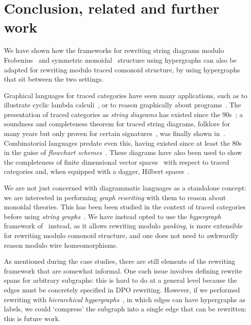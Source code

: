 \section{Conclusion, related and further work}

We have shown how the frameworks for rewriting string diagrams modulo
Frobenius~\cite{bonchi2022string} and symmetric
monoidal~\cite{bonchi2022stringa} structure using hypergraphs can also be
adapted for rewriting modulo traced comonoid structure, by using
hypergraphs that sit between the two settings.

Graphical languages for traced categories have seen many applications, such as
to illustrate cyclic lambda calculi~\cite{hasegawa1997recursion}, or to reason
graphically about programs~\cite{schweimeier1999categorical}.
The presentation of traced categories as \emph{string diagrams} has existed
since the 90s~\cite{joyal1991geometry,joyal1996traced}; a soundness and
completeness theorem for traced string diagrams, folklore for many years
but only proven for certain signatures~\cite{selinger2011survey}, was finally
shown in~\cite{kissinger2014abstract}.
Combinatorial languages predate even this, having existed since at least the 80s
in the guise of
\emph{flowchart schemes}~\cite{stefanescu1990feedback,cazanescu1990new,cazanescu1994feedback}.
These diagrams have also been used to show the completeness of finite dimensional
vector spaces~\cite{hasegawa2008finite} with respect to traced categories and,
when equipped with a dagger, Hilbert spaces~\cite{selinger2012finite}.

We are not just concerned with diagrammatic languages as a standalone concept:
we are interested in performing \emph{graph rewriting} with them to reason about
monoidal theories.
This has been been studied in the context of traced categories before using
\emph{string graphs}~\cite{kissinger2012pictures,dixon2013opengraphs}.
We have instead opted to use the \emph{hypergraph} framework
of~\cite{bonchi2022string,bonchi2022stringa,bonchi2022stringb} instead, as it
allows rewriting modulo \emph{yanking}, is more extensible for rewriting modulo
comonoid structure, and one does not need to awkwardly reason modulo wire
homeomorphisms.

As mentioned during the case studies, there are still elements of the rewriting
framework that are somewhat informal.
One such issue involves defining rewrite spans for arbitrary subgraphs: this is
hard to do at a general level because the edges must be concretely specified in
DPO rewriting.
However, if we performed rewriting with
\emph{hierarchical hypergraphs}~\cite{alvarez-picallo2021functorial}, in
which edges can have hypergraphs as labels, we could `compress' the subgraph
into a single edge that can be rewritten: this is future work.

